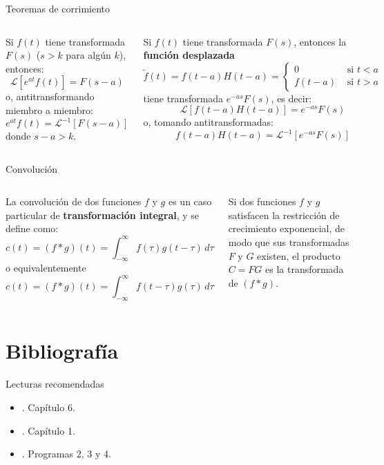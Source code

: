 \documentclass[9pt, aspectratio=169]{beamer}
\begin{document}
\begin{frame}{Teoremas de corrimiento}
\begin{columns}[t]
\cx 
\begin{theorem}[Corrimiento $s$]
Si $f(t)$ tiene transformada $F(s)$ ($s > k$ para algún $k$), entonces:
\[ \mathscr{L}[e^{at} f(t)] = F(s -a) \]
o, antitransformando miembro a miembro:
\[ e^{at} f(t) = \mathscr{L}^{-1} [F(s -a)] \]
donde $s - a > k$.
\end{theorem}

\cx
\begin{theorem}[Corrimiento $t$]
    Si $f(t)$ tiene transformada $F(s)$, entonces la \textbf{función desplazada}
    \[ \tilde{f}(t) = f(t - a) H(t - a) = 
        \begin{cases}
        0 & \text{ si } t < a \\
        f(t - a) & \text{ si } t > a 
        \end{cases}
    \]
tiene transformada $e^{-a s} F(s)$, es decir:
\[ \mathscr{L}[f(t - a) H(t - a)] = e^{-a s} F(s) \]
o, tomando antitransformadas:
\[ f(t -a) H(t-a) = \mathscr{L}^{-1}[e^{- a s} F(s)] \]
\end{theorem}
\end{columns}
\end{frame}

\begin{frame}{Convolución}
    \begin{columns}[t]
    \cx
    La convolución de dos funciones $f$ y $g$ es un caso particular de \textbf{transformación integral}, y se define como:
    \[ c(t) = (f * g)(t) = \int_{-\infty}^{\infty} f(\tau) g(t - \tau) \, d\tau \]
    o equivalentemente
    \[ c(t) = (f * g)(t) = \int_{-\infty}^{\infty} f(t - \tau) g(\tau) \, d\tau \]

    \cx
    \begin{theorem}[Convolución]
    Si dos funciones $f$ y $g$ satisfacen la restricción de crecimiento exponencial, de modo que sus transformadas $F$ y $G$ existen, el producto $C = FG$ es la transformada de $(f * g)$.
    \end{theorem}
    \end{columns}
\end{frame}

\section*{Bibliografía}
\begin{frame}[allowframebreaks]{Lecturas recomendadas}
\begin{itemize}
 \item {}. Capítulo 6.
 \item {}. Capítulo 1.
 \item {}. Programas 2, 3 y 4.
\end{itemize}
\end{frame}
\end{document}
